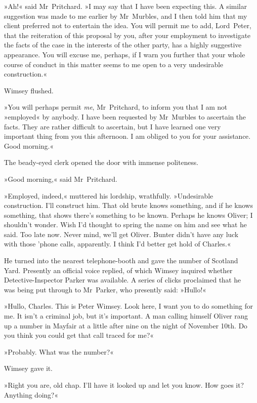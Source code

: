 »Ah!« said Mr~Pritchard. »I may say that I have been expecting this. A similar suggestion was made to me earlier by Mr~Murbles, and I then told him that my client preferred not to entertain the idea. You will permit me to add, Lord~Peter, that the reiteration of this proposal by you, after your employment to investigate the facts of the case in the interests of the other party, has a highly suggestive appearance. You will excuse me, perhaps, if I warn you further that your whole course of conduct in this matter seems to me open to a very undesirable construction.«

Wimsey flushed.

»You will perhaps permit \textit{me}, Mr~Pritchard, to inform you that I am not »employed« by anybody. I have been requested by Mr~Murbles to ascertain the facts. They are rather difficult to ascertain, but I have learned one very important thing from you this afternoon. I am obliged to you for your assistance. Good morning.«

The beady-eyed clerk opened the door with immense politeness.

»Good morning,« said Mr~Pritchard.

»Employed, indeed,« muttered his lordship, wrathfully. »Undesirable construction. I'll construct him. That old brute knows something, and if he knows something, that shows there's something to be known. Perhaps he knows Oliver; I shouldn't wonder. Wish I'd thought to spring the name on him and see what he said. Too late now. Never mind, we'll get Oliver. Bunter didn't have any luck with those 'phone calls, apparently. I think I'd better get hold of Charles.«

He turned into the nearest telephone-booth and gave the number of Scotland Yard. Presently an official voice replied, of which Wimsey inquired whether Detective-Inspector Parker was available. A series of clicks proclaimed that he was being put through to Mr~Parker, who presently said: »Hullo!«

»Hullo, Charles. This is Peter Wimsey. Look here, I want you to do something for me. It isn't a criminal job, but it's important. A man calling himself Oliver rang up a number in Mayfair at a little after nine on the night of November 10th. Do you think you could get that call traced for me?«

»Probably. What was the number?«

Wimsey gave it.

»Right you are, old chap. I'll have it looked up and let you know. How goes it? Anything doing?«

